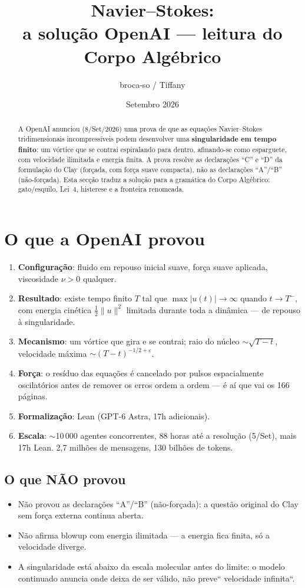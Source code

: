 \documentclass[11pt,a4paper]{article}
\title{Navier--Stokes:\\
a solução OpenAI --- leitura do Corpo Algébrico}
\author{broca-so / Tiffany}
\date{Setembro 2026}
\begin{document}
\maketitle

\begin{abstract}
A OpenAI anunciou (8/Set/2026) uma prova de que as equações
Navier--Stokes tridimensionais incompressíveis podem desenvolver
uma \textbf{singularidade em tempo finito}: um vórtice que se
contrai espiralando para dentro, afinando-se como esparguete,
com velocidade ilimitada e energia finita.
A prova resolve as declarações ``C'' e ``D'' da formulação do Clay
(forçada, com força suave compacta), não as declarações ``A''/``B''
(não-forçada).
Esta secção traduz a solução para a gramática do Corpo Algébrico:
gato/esquilo, Lei~4, histerese e a fronteira renomeada.
\end{abstract}

\section{O que a OpenAI provou}\label{sec:openai}

\begin{enumerate}
\item \textbf{Configuração}: fluido em repouso inicial suave,
  força suave aplicada, viscosidade $\nu>0$ qualquer.
\item \textbf{Resultado}: existe tempo finito $T$ tal que
  $\max|u(t)|\to\infty$ quando $t\to T^{-}$,
  com energia cinética $\tfrac12\|u\|^2$ limitada durante toda a
  dinâmica — de repouso à singularidade.
\item \textbf{Mecanismo}: um vórtice que gira e se contrai;
  raio do núcleo $\sim\sqrt{T-t}$, velocidade máxima
  $\sim(T-t)^{-1/2+\varepsilon}$.
\item \textbf{Força}: o resíduo das equações é cancelado por
  pulsos espacialmente oscilatórios antes de remover os erros
  ordem a ordem — é aí que vai os 166 páginas.
\item \textbf{Formalização}: Lean (GPT-6 Astra, 17h adicionais).
\item \textbf{Escala}: $\sim$10\,000 agentes concorrentes,
  88 horas até a resolução (5/Set), mais 17h Lean.
  2,7 milhões de mensagens, 130 bilhões de tokens.
\end{enumerate}

\subsection{O que NÃO provou}
\begin{itemize}
\item Não provou as declarações ``A''/``B'' (não-forçada):
  a questão original do Clay sem força externa continua aberta.
\item Não afirma blowup com energia ilimitada — a energia fica
  finita, só a velocidade diverge.
\item A singularidade está abaixo da escala molecular antes do
  limite: o modelo continuado anuncia onde deixa de ser válido,
  não preve`` velocidade infinita``.
\end{itemize}
\end{document}
